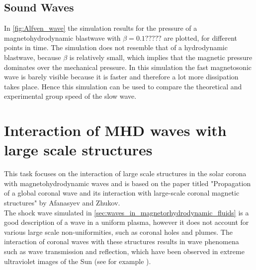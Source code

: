 \documentclass[a4paper]{article}
\begin{document}

\subsection{Sound Waves}
In \cref{fig:Alfven_wave} the simulation results for the pressure of a magnetohydrodynamic blastwave with $\beta = 0.1?????$ are plotted, for different points in time. 
The simulation does not resemble that of a hydrodynamic blastwave, because $\beta$ is relatively small, which implies that the magnetic pressure dominates over the mechanical pressure.
In this simulation the fast magnetosonic wave is barely visible because it is faster and therefore a lot more dissipation takes place. 
Hence this simulation can be used to compare the theoretical and 
experimental group speed of the slow wave.
\section{Interaction of MHD waves with large scale structures}
This task focuses on the interaction of large scale structures in the solar corona with magnetohydrodynamic waves and is based on the paper titled "Propagation of a global coronal wave and its interaction with large-scale coronal magnetic structures" by Afanasyev and Zhukov.  \cite{afanasyev2018propagation}\\

The shock wave simulated in \cref{sec:waves_in_magnetorhydrodynamic_fluids} is a good description of a wave in a uniform plasma, however it does not account for various large scale non-uniformities, such as coronal holes and plumes. The interaction of coronal waves with these structures results in wave phenomena such as wave transmission and reflection, which have been observed in extreme ultraviolet images of the Sun (see for example \cite{gopalswamy2009euv}).
\end{document}
